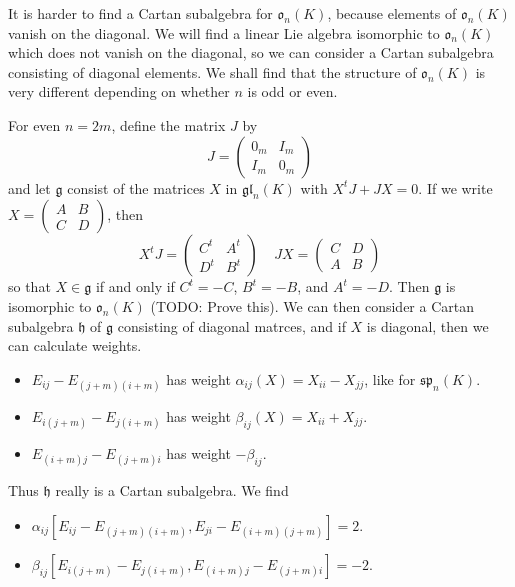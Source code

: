 \begin{example}
    It is harder to find a Cartan subalgebra for $\mathfrak{o}_n(K)$, because elements of $\mathfrak{o}_n(K)$ vanish on the diagonal. We will find a linear Lie algebra isomorphic to $\mathfrak{o}_n(K)$ which does not vanish on the diagonal, so we can consider a Cartan subalgebra consisting of diagonal elements. We shall find that the structure of $\mathfrak{o}_n(K)$ is very different depending on whether $n$ is odd or even.

    For even $n = 2m$, define the matrix $J$ by
    \[ J = \begin{pmatrix} 0_m & I_m \\ I_m & 0_m \end{pmatrix} \]
    and let $\mathfrak{g}$ consist of the matrices $X$ in $\mathfrak{gl}_n(K)$ with $X^tJ + JX = 0$. If we write $X = \left( \begin{smallmatrix} A & B \\ C & D \end{smallmatrix} \right)$, then
    \[ X^tJ = \begin{pmatrix} C^t & A^t \\ D^t & B^t \end{pmatrix}\ \ \ \ \ JX = \begin{pmatrix} C & D \\ A & B \end{pmatrix} \]
    so that $X \in \mathfrak{g}$ if and only if $C^t = - C$, $B^t = -B$, and $A^t = -D$. Then $\mathfrak{g}$ is isomorphic to $\mathfrak{o}_n(K)$ (TODO: Prove this). We can then consider a Cartan subalgebra $\mathfrak{h}$ of $\mathfrak{g}$ consisting of diagonal matrces, and if $X$ is diagonal, then we can calculate weights.
    \begin{itemize}
        \item $E_{ij} - E_{(j+m)(i+m)}$ has weight $\alpha_{ij}(X) = X_{ii} - X_{jj}$, like for $\mathfrak{sp}_n(K)$.
        \item $E_{i(j+m)} - E_{j(i+m)}$ has weight $\beta_{ij}(X) = X_{ii} + X_{jj}$.
        \item $E_{(i+m)j} - E_{(j+m)i}$ has weight $-\beta_{ij}$.
    \end{itemize}
    Thus $\mathfrak{h}$ really is a Cartan subalgebra. We find
    \begin{itemize}
        \item $\alpha_{ij}[E_{ij} - E_{(j+m)(i+m)}, E_{ji} - E_{(i+m)(j+m)}] = 2$.
        \item $\beta_{ij}[E_{i(j+m)} - E_{j(i+m)}, E_{(i+m)j} - E_{(j+m)i}] = -2$.

\end{itemize}
\end{example}
